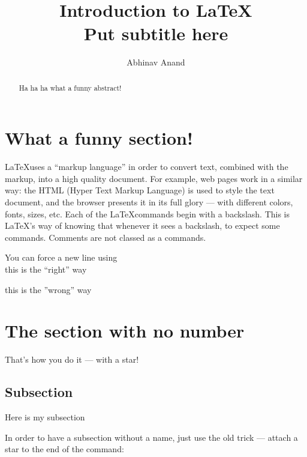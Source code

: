 \documentclass[a4paper,12pt]{article}
\title{Introduction to \LaTeX\\
\scriptsize{Put subtitle here}} %
\author{Abhinav Anand}
\date{} %
\begin{document}
\maketitle %

\begin{abstract}

Ha ha ha what a funny abstract!

\end{abstract}

\section{What a funny section!}
\label{Funny_Label}

\LaTeX uses a ``markup language'' in order to convert text, combined with the markup, into a high quality document. For example, web pages work in a similar way: the HTML 
(Hyper Text Markup Language) is used to style the text document, and the browser presents it in its full glory --- with different colors, fonts, sizes, etc.
Each of the \LaTeX commands begin with a backslash. This is \LaTeX's way of knowing that whenever it sees a backslash, to expect some commands. Comments are not classed as a commands.

You can force a new line using \\

this is the ``right'' way

this is the ''wrong'' way

\section*{The section with no number}

That's how you do it --- with a star!

\subsection{Subsection}

Here is my subsection

In order to have a subsection without a name, just use the old trick --- attach
a star to the end of the command: %
\end{document}
